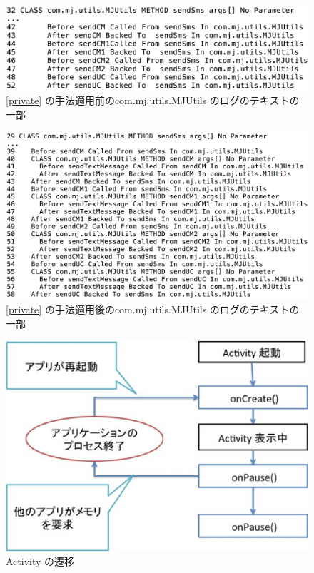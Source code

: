 \begin{figure}[t]
\begin{center}
\graphicspath{{./epsfiles/}}
\includegraphics[scale=0.15]{mjutilslog1.eps}
\end{center}
\caption{\ref{private} の手法適用前のcom.mj.utils.MJUtils のログのテキストの一部}
\label{mjutilslog1}
\end{figure}

\begin{figure}[t]
\begin{center}
\graphicspath{{./epsfiles/}}
\includegraphics[scale=0.15]{mjutilslog2.eps}
\end{center}
\caption{\ref{private} の手法適用後のcom.mj.utils.MJUtils のログのテキストの一部}
\label{mjutilslog2}
\end{figure}



\begin{figure}[t]
\begin{center}
\graphicspath{{./epsfiles/}}
\includegraphics[scale=0.4]{activity3.eps}
\end{center}
\caption{Activity の遷移}
\label{activity}
\end{figure}


